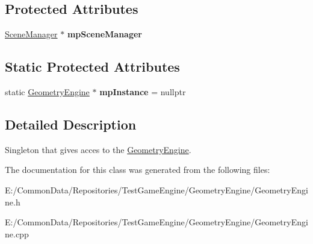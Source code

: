 \subsection*{Protected Attributes}
\begin{DoxyCompactItemize}
\item 
\mbox{\label{class_geometry_engine_1_1_geometry_engine_a6cd62e22c42522ad7c49f50d8d383ca3}} 
\mbox{\hyperlink{class_geometry_engine_1_1_scene_manager}{Scene\+Manager}} $\ast$ {\bfseries mp\+Scene\+Manager}
\end{DoxyCompactItemize}
\subsection*{Static Protected Attributes}
\begin{DoxyCompactItemize}
\item 
\mbox{\label{class_geometry_engine_1_1_geometry_engine_a313d47008b8ce30f251eb50d44cf1830}} 
static \mbox{\hyperlink{class_geometry_engine_1_1_geometry_engine}{Geometry\+Engine}} $\ast$ {\bfseries mp\+Instance} = nullptr
\end{DoxyCompactItemize}


\subsection{Detailed Description}
Singleton that gives acces to the \mbox{\hyperlink{class_geometry_engine_1_1_geometry_engine}{Geometry\+Engine}}. 

The documentation for this class was generated from the following files\+:\begin{DoxyCompactItemize}
\item 
E\+:/\+Common\+Data/\+Repositories/\+Test\+Game\+Engine/\+Geometry\+Engine/Geometry\+Engine.\+h\item 
E\+:/\+Common\+Data/\+Repositories/\+Test\+Game\+Engine/\+Geometry\+Engine/Geometry\+Engine.\+cpp\end{DoxyCompactItemize}
